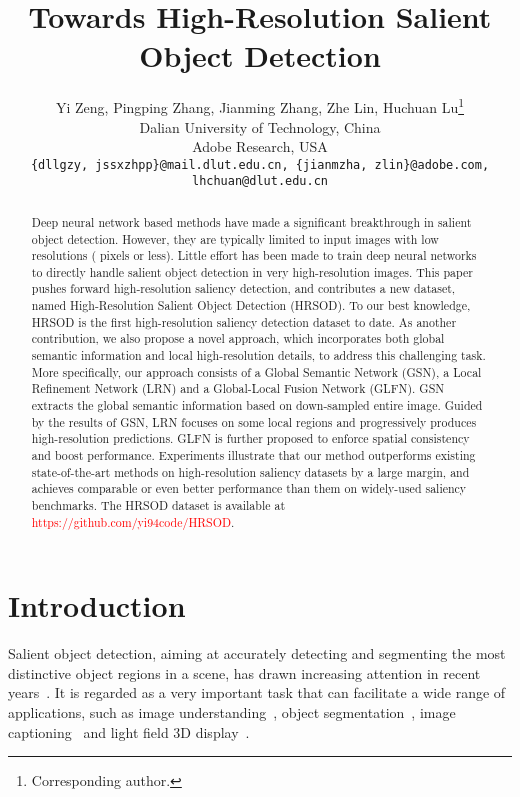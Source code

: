 \documentclass[10pt,twocolumn,letterpaper]{article}
\begin{document}
\title{Towards High-Resolution Salient Object Detection}
\author{Yi Zeng, Pingping Zhang, Jianming Zhang, Zhe Lin, Huchuan Lu\thanks{Corresponding author.}\\
 Dalian University of Technology, China\\
 Adobe Research, USA\\
{\tt\small \{dllgzy, jssxzhpp\}@mail.dlut.edu.cn, \{jianmzha, zlin\}@adobe.com, lhchuan@dlut.edu.cn}\\
}

\maketitle
\ificcvfinal\thispagestyle{empty}\fi

\begin{abstract}
Deep neural network based methods have made a significant breakthrough in salient object detection.
However, they are typically limited to input images with low resolutions ( pixels or less).
Little effort has been made to train deep neural networks to directly handle salient object detection in very high-resolution images.
This paper pushes forward high-resolution saliency detection, and contributes a new dataset, named High-Resolution Salient Object Detection (HRSOD).
To our best knowledge, HRSOD is the first high-resolution saliency detection dataset to date.
As another contribution, we also propose a novel approach, which incorporates both global semantic information and local high-resolution details, to address this challenging task.
More specifically, our approach consists of a Global Semantic Network (GSN), a Local Refinement Network (LRN) and a Global-Local Fusion Network (GLFN).
GSN extracts the global semantic information based on down-sampled entire image.
Guided by the results of GSN, LRN focuses on some local regions and progressively produces high-resolution predictions.
GLFN is further proposed to enforce spatial consistency and boost performance.
Experiments illustrate that our method outperforms existing state-of-the-art methods on high-resolution saliency datasets by a large margin, and achieves comparable or even better performance than them on widely-used saliency benchmarks.
The HRSOD dataset is available at \textcolor{red}{https://github.com/yi94code/HRSOD}.
\end{abstract}

\section{Introduction}
Salient object detection, aiming at accurately detecting and segmenting the most distinctive object regions in a scene, has drawn increasing attention in recent years~\cite{fan2018salient,zhang2019salient,zhang2018hyperfusion,zhang2018agile,zhang2018non}. It is regarded as a very important task that can facilitate a wide range of applications, such as image understanding~\cite{lai2016saliency,zhu2015unsupervised,zhang2015saliency}, object segmentation~\cite{joon2017exploiting}, image captioning~\cite{fang2015captions,das2017human,xu2015show} and light field 3D display~\cite{wang2018salience}.
\end{document}
